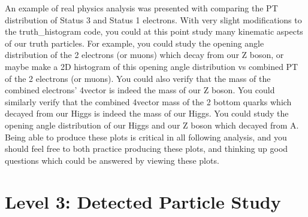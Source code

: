 \documentclass{article}
\begin{document}
An example of real physics analysis was presented with comparing the PT distribution of Status
3 and Status 1 electrons. With very slight modifications to the truth\_histogram code, you could
at this point study many kinematic aspects of our truth particles. For example, you could study
the opening angle distribution of the 2 electrons (or muons) which decay from our Z boson, or
maybe make a 2D histogram of this opening angle distribution vs combined PT of the 2 electrons
(or muons). You could also verify that the mass of the combined electrons' 4vector is indeed
the mass of our Z boson. You could similarly verify that the combined 4vector mass of the 2
bottom quarks which decayed from our Higgs is indeed the mass of our Higgs. You could study
the opening angle distribution of our Higgs and our Z boson which decayed from A. Being able
to produce these plots is critical in all following analysis, and you should feel free to both
practice producing these plots, and thinking up good questions which could be answered by viewing these plots.

\section{Level 3: Detected Particle Study}
\end{document}
